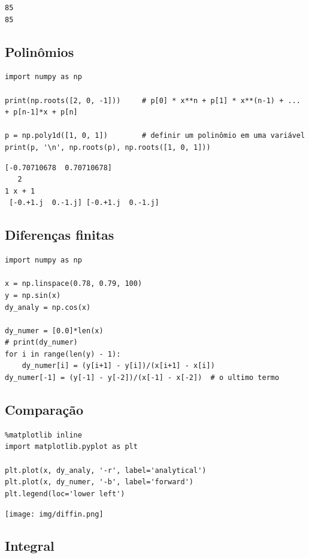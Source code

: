 \documentclass[presentation]{beamer}
\begin{document}
\begin{verbatim}
85
85
\end{verbatim}

\subsection{Polinômios}
\label{sec:orgheadline18}

\begin{verbatim}
import numpy as np

print(np.roots([2, 0, -1]))     # p[0] * x**n + p[1] * x**(n-1) + ... + p[n-1]*x + p[n]

p = np.poly1d([1, 0, 1])        # definir um polinômio em uma variável
print(p, '\n', np.roots(p), np.roots([1, 0, 1]))
\end{verbatim}

\begin{verbatim}
[-0.70710678  0.70710678]
   2
1 x + 1 
 [-0.+1.j  0.-1.j] [-0.+1.j  0.-1.j]
\end{verbatim}

\subsection{Diferenças finitas}
\label{sec:orgheadline19}


\begin{verbatim}
import numpy as np

x = np.linspace(0.78, 0.79, 100)
y = np.sin(x)
dy_analy = np.cos(x)

dy_numer = [0.0]*len(x)
# print(dy_numer)
for i in range(len(y) - 1):
    dy_numer[i] = (y[i+1] - y[i])/(x[i+1] - x[i])
dy_numer[-1] = (y[-1] - y[-2])/(x[-1] - x[-2])  # o ultimo termo
\end{verbatim}

\subsection{Comparação}
\label{sec:orgheadline20}

\begin{verbatim}
%matplotlib inline
import matplotlib.pyplot as plt

plt.plot(x, dy_analy, '-r', label='analytical')
plt.plot(x, dy_numer, '-b', label='forward')
plt.legend(loc='lower left')
\end{verbatim}

\texttt{[image: img/diffin.png]}
\subsection{Integral}
\label{sec:orgheadline21}
\end{document}
